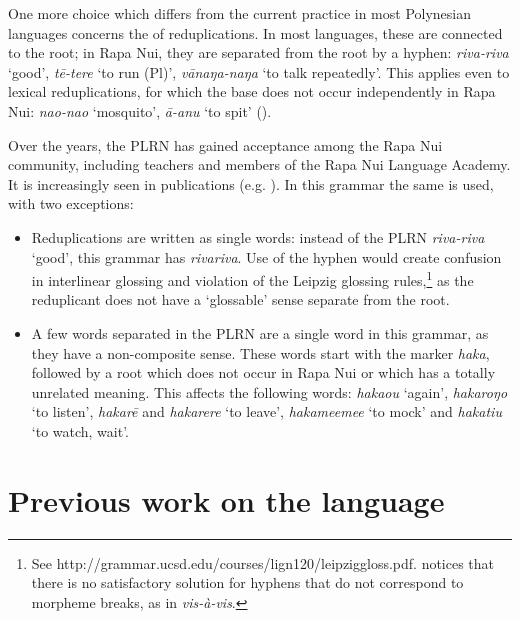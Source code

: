 One more choice which differs from the current practice in most Polynesian languages concerns the  of reduplications. In most languages, these are connected to the root; in Rapa Nui, they are separated from the root by a hyphen: \textit{\mbox{riva-riva}} ‘good’, \textit{\mbox{tē-tere}} ‘to run (Pl)’, \textit{\mbox{vānaŋa-naŋa}} ‘to talk repeatedly’. This applies even to lexical reduplications, for which the base does not occur independently in Rapa Nui: \textit{\mbox{nao-nao}} ‘mosquito’, \textit{\mbox{{\ꞌ}ā-{\ꞌ}anu}} ‘to spit’ (). 

Over the years, the PLRN  has gained acceptance among the Rapa Nui community, including teachers and members of the Rapa Nui Language Academy. It is increasingly seen in publications (e.g. \citealt{GleisnerMontt2014}). In this grammar the same  is used, with two exceptions:

\begin{itemize}
\item 
Reduplications are written as single words: instead of the PLRN  \textit{\mbox{riva-riva}} ‘good’, this grammar has \textit{rivariva}. Use of the hyphen would create confusion in interlinear glossing and violation of the Leipzig glossing rules,\footnote{\label{fn:23}See http://grammar.ucsd.edu/courses/lign120/leipziggloss.pdf. \citet{Lehmann2004} notices that there is no satisfactory solution for hyphens that do not correspond to morpheme breaks, as in \textit{vis-à-vis}.} as the reduplicant does not have a ‘glossable’ sense separate from the root.

\item 
A few words separated in the PLRN  are a single word in this grammar, as they have a non-composite sense. These words start with the  marker \textit{haka}, followed by a root which does not occur in Rapa Nui or which has a totally unrelated meaning. This affects the following words: \textit{haka{\ꞌ}ou} ‘again’, \textit{hakaroŋo} ‘to listen’, \textit{hakarē} and \textit{hakarere} ‘to leave’, \textit{hakame{\ꞌ}eme{\ꞌ}e} ‘to mock’ and \textit{hakatiu} ‘to watch, wait’. 

\end{itemize}

\section{Previous work on the language}\label{sec:1.5}

